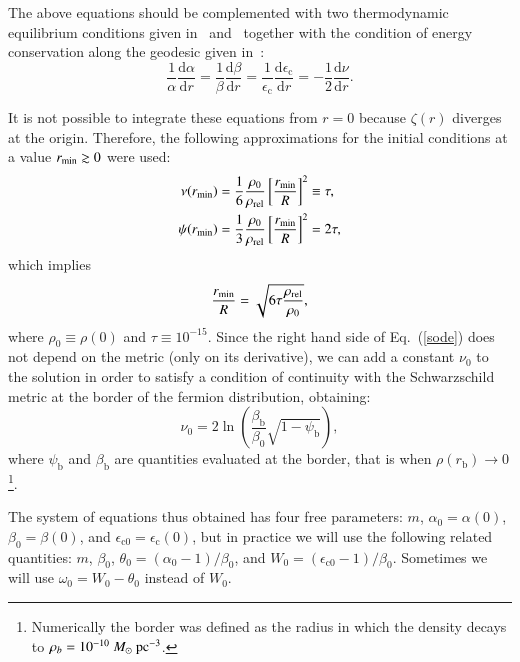 \documentclass[twocolumn]{aa}
\begin{document}
The above equations should be complemented with two thermodynamic equilibrium conditions given
in~\citet{PhysRev.35.904} and~\citet{RevModPhys.21.531} together with the condition of energy conservation
along the geodesic given in~\citet{1989A&A...221....4M}:
\begin{equation}
   \frac{1}{\alpha}\frac{\mathrm{d}\alpha}{\mathrm{d}r}=\frac{1}{\beta}\frac{\mathrm{d}\beta}{\mathrm{d}r}=
   \frac{1}{\epsilon_\mathrm{c}}\frac{\mathrm{d}\epsilon_\mathrm{c}}{\mathrm{d}r}=-\frac{1}{2}\frac{\mathrm{d}\nu}{\mathrm{d}r}.
   \label{geod_energy}
\end{equation}

It is not possible to integrate these equations from $r=0$ because $\zeta(r)$ diverges at the origin.
Therefore, the following approximations for the initial conditions at a value $r_{\rm{min}}\gtrsim 0$ were used:
\begin{align}
   \nu(r_{\rm{min}}) &= \frac{1}{6}\frac{\rho_0}{\rho_{\rm{rel}}}\left[\frac{r_{\rm{min}}}{R}\right]^2\equiv\tau, \\
   \psi(r_{\rm{min}})&= \frac{1}{3}\frac{\rho_0}{\rho_{\rm{rel}}}\left[\frac{r_{\rm{min}}}{R}\right]^2 = 2\tau,
\end{align}
which implies
\begin{equation}
   \frac{r_{\rm{min}}}{R}=\sqrt{6\tau\frac{\rho_{\rm{rel}}}{\rho_0}},
\end{equation}
where $\rho_0\equiv \rho(0)$ and $\tau\equiv 10^{-15}$.
Since the right hand side of Eq.~(\ref{sode}) does not depend on the metric (only on its derivative), we can add
a constant $\nu_0$ to the solution in order to satisfy a condition of continuity with the Schwarzschild metric at the border of the fermion distribution, obtaining:
\begin{equation}
\nu_0 = 2\ln\left(\frac{\beta_\mathrm{b}}{\beta_0}\sqrt{1-\psi_\mathrm{b}}\right),
\end{equation}
where $\psi_\mathrm{b}$ and $\beta_\mathrm{b}$ are quantities evaluated at the border, that is when
$\rho(r_\mathrm{b})\rightarrow 0$\footnote{Numerically the border was defined as the radius in which
the density decays to $\rho_b=10^{-10}~M_\odot~\rm{pc}^{-3}$.}.

The system of equations thus obtained has four free parameters: $m$, $\alpha_0=\alpha(0)$,
$\beta_0=\beta(0)$, and $\epsilon_{\mathrm{c}0}=\epsilon_\mathrm{c}(0)$, but in practice we will use the following related
quantities:
$m$, $\beta_0$, $\theta_0=(\alpha_0-1)/\beta_0$, and $W_0=(\epsilon_{\mathrm{c}0}-1)/\beta_0$.
Sometimes we will use $\omega_0=W_0-\theta_0$ instead of $W_0$.
\end{document}
